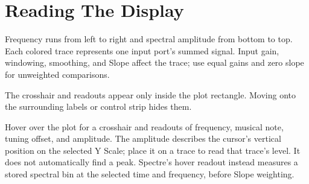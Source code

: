 \section{Reading The Display}\label{sec:display}

Frequency runs from left to right and spectral amplitude from bottom to top.
Each colored trace represents one input port's summed signal. Input gain,
windowing, smoothing, and Slope affect the trace; use equal gains and zero
slope for unweighted comparisons.

The crosshair and readouts appear only inside the plot rectangle. Moving
onto the surrounding labels or control strip hides them.

Hover over the plot for a crosshair and readouts of frequency, musical note,
tuning offset, and amplitude. The amplitude describes the cursor's vertical
position on the selected Y Scale; place it on a trace to read that trace's
level. It does not automatically find a peak. Spectre's hover readout instead
measures a stored spectral bin at the selected time and frequency, before
Slope weighting.

